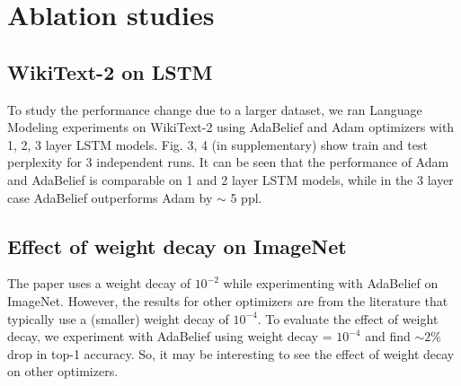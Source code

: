 \section{Ablation studies}
\label{lab:ablation}
\subsection{WikiText-2 on LSTM}
\label{lab:WT2_LSTM}
To study the performance change due to a larger dataset, we ran Language Modeling experiments on WikiText-2 \cite{WikiText_2} using AdaBelief and Adam optimizers with 1, 2, 3 layer LSTM models. Fig. 3, 4 (in supplementary) show train and test perplexity for 3 independent runs. It can be seen that the performance of Adam and AdaBelief is comparable on 1 and 2 layer LSTM models, while in the 3 layer case AdaBelief outperforms Adam by $\sim$ 5 ppl.

\subsection{Effect of weight decay on ImageNet}
\label{lab:wd_effect}
The paper \cite{zhuang_adabelief_2020} uses a weight decay of $10^{-2}$ while experimenting with AdaBelief on ImageNet. However, the results for other optimizers are from the literature that typically use a (smaller) weight decay of $10^{-4}$. To evaluate the effect of weight decay, we experiment with AdaBelief using weight decay = $10^{-4}$ and find $\sim 2\%$ drop in top-1 accuracy. So, it may be interesting to see the effect of weight decay on other optimizers.




